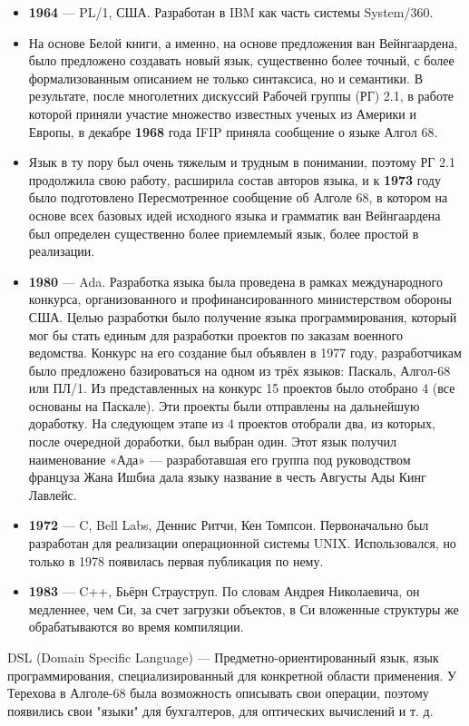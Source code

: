 \documentclass[12pt, a4paper]{article}
\begin{document}
\begin{itemize}
    \item \textbf{1964} --- PL/1, США. Разработан в IBM как часть системы System/360. 
    \item На основе Белой книги, а именно, на основе предложения ван Вейнгаардена, было предложено создавать новый язык, существенно более точный, с более формализованным описанием не только синтаксиса, но и семантики. В результате, после многолетних дискуссий Рабочей группы (РГ) 2.1, в работе которой приняли участие множество известных ученых из Америки и Европы, в декабре \textbf{1968} года IFIP приняла сообщение о языке Алгол 68.
    \item Язык в ту пору был очень тяжелым и трудным в понимании, поэтому РГ 2.1 продолжила свою работу, расширила состав авторов языка, и к \textbf{1973} году было подготовлено Пересмотренное сообщение об Алголе 68, в котором на основе всех базовых идей исходного языка и грамматик ван Вейнгаардена был определен существенно более приемлемый язык, более простой в реализации.
    \item \textbf{1980} --- Ada. Разработка языка была проведена в рамках международного конкурса, организованного и профинансированного министерством обороны США. Целью разработки было получение языка программирования, который мог бы стать единым для разработки проектов по заказам военного ведомства. Конкурс на его создание был объявлен в 1977 году, разработчикам было предложено базироваться на одном из трёх языков: Паскаль, Алгол-68 или ПЛ/1. Из представленных на конкурс 15 проектов было отобрано 4 (все основаны на Паскале). Эти проекты были отправлены на дальнейшую доработку. На следующем этапе из 4 проектов отобрали два, из которых, после очередной доработки, был выбран один. Этот язык получил наименование «Ада» — разработавшая его группа под руководством француза Жана Ишбиа дала языку название в честь Августы Ады Кинг Лавлейс.
    \item \textbf{1972} --- C, Bell Labs, Деннис Ритчи, Кен Томпсон. Первоначально был разработан для реализации операционной системы UNIX. Использовался, но только в 1978 появилась первая публикация по нему.
    \item \textbf{1983} --- C++, Бьёрн Страуструп. По словам Андрея Николаевича, он медленнее, чем Си, за счет загрузки объектов, в Си вложенные структуры же обрабатываются во время компиляции.
\end{itemize}

DSL (Domain Specific Language) --- Предметно-ориентированный язык, язык программирования, специализированный для конкретной области применения. У Терехова в Алголе-68 была возможность описывать свои операции, поэтому появились свои "языки"{} для бухгалтеров, для оптических вычислений и т. д.\\
\end{document}
